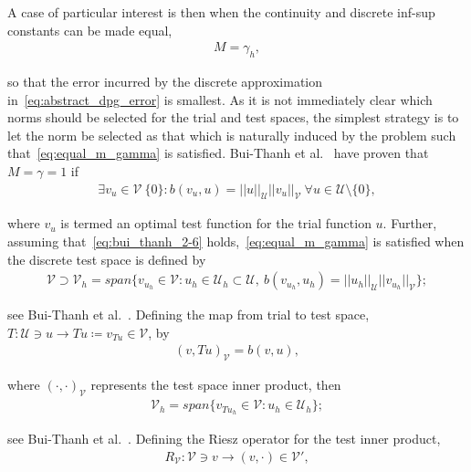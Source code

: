 A case of particular interest is then when the continuity and discrete inf-sup constants can be made equal,
\begin{align} \label{eq:equal_m_gamma}
M = \gamma_h,
\end{align}

so that the error incurred by the discrete approximation in~\eqref{eq:abstract_dpg_error} is smallest. As it is not
immediately clear which norms should be selected for the trial and test spaces, the simplest strategy is to let the norm
be selected as that which is naturally induced by the problem such that~\eqref{eq:equal_m_gamma} is satisfied. Bui-Thanh
et al.~\cite[Theorem ]{BuiThanh2013} have proven that $M = \gamma = 1$ if
\begin{align} \label{eq:bui_thanh_2-6}
\exists v_u \in \mathcal{V}\ \{0\} : b(v_u,u) = ||u||_{\mathcal{U}} ||v_u||_{\mathcal{V}}\ \forall u \in \mathcal{U}
\setminus \{0\},
\end{align}

where $v_u$ is termed an optimal test function for the trial function $u$. Further, assuming
that~\eqref{eq:bui_thanh_2-6} holds,~\eqref{eq:equal_m_gamma} is satisfied when the discrete test space is defined by
\begin{align}
\mathcal{V} \supset \mathcal{V}_h 
= span \{ v_{u_h} \in \mathcal{V} : u_h \in \mathcal{U}_h \subset \mathcal{U},\ b(v_{u_h},u_h) 
= ||u_h||_{\mathcal{U}} ||v_{u_h}||_{\mathcal{V}} \};
\end{align}

see Bui-Thanh et al.~\cite[Lemma ]{BuiThanh2013}. Defining the map from trial to test space, $T :
\mathcal{U} \ni u \rightarrow Tu \coloneqq v_{Tu} \in \mathcal{V} $, by
\begin{align}
(v,Tu)_{\mathcal{V}} = b(v,u),
\end{align}

where $(\cdot,\cdot)_{\mathcal{V}}$ represents the test space inner product, then
\begin{align} \label{eq:space_optimal_test}
\mathcal{V}_h = span \{ v_{T u_h} \in \mathcal{V} : u_h \in \mathcal{U}_h \};
\end{align}

see Bui-Thanh et al.~\cite[Theorem ]{BuiThanh2013}. Defining the Riesz operator for the test inner
product,
\begin{align}
R_{\mathcal{V}} : \mathcal{V} \ni v \rightarrow (v,\cdot) \in \mathcal{V}',
\end{align}

